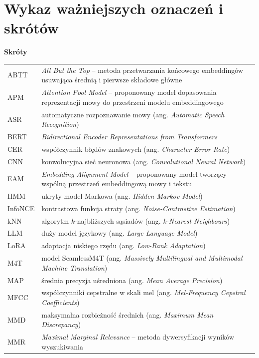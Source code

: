 \chapter*{Wykaz ważniejszych oznaczeń i skrótów}

\noindent\textbf{Skróty}

\begin{longtable}{@{}p{2.6cm}p{\dimexpr\linewidth-2.6cm-2\tabcolsep\relax}@{}}
ABTT & \textit{All But the Top} -- metoda przetwarzania końcowego embeddingów usuwająca średnią i pierwsze składowe główne \\
APM & \textit{Attention Pool Model} -- proponowany model dopasowania reprezentacji mowy do przestrzeni modelu embeddingowego \\
ASR & automatyczne rozpoznawanie mowy (ang. \textit{Automatic Speech Recognition}) \\
BERT & \textit{Bidirectional Encoder Representations from Transformers} \\
CER & współczynnik błędów znakowych (ang. \textit{Character Error Rate}) \\
CNN & konwolucyjna sieć neuronowa (ang. \textit{Convolutional Neural Network}) \\
EAM & \textit{Embedding Alignment Model} -- proponowany model tworzący wspólną przestrzeń embeddingową mowy i tekstu \\
HMM & ukryty model Markowa (ang. \textit{Hidden Markov Model}) \\
InfoNCE & kontrastowa funkcja straty (ang. \textit{Noise-Contrastive Estimation}) \\
kNN & algorytm $k$-najbliższych sąsiadów (ang. \textit{k-Nearest Neighbours}) \\
LLM & duży model językowy (ang. \textit{Large Language Model}) \\
LoRA & adaptacja niskiego rzędu (ang. \textit{Low-Rank Adaptation}) \\
M4T & model SeamlessM4T (ang. \textit{Massively Multilingual and Multimodal Machine Translation}) \\
MAP & średnia precyzja uśredniona (ang. \textit{Mean Average Precision}) \\
MFCC & współczynniki cepstralne w skali mel (ang. \textit{Mel-Frequency Cepstral Coefficients}) \\
MMD & maksymalna rozbieżność średnich (ang. \textit{Maximum Mean Discrepancy}) \\
MMR & \textit{Maximal Marginal Relevance} -- metoda dywersyfikacji wyników wyszukiwania \\

\end{longtable}
